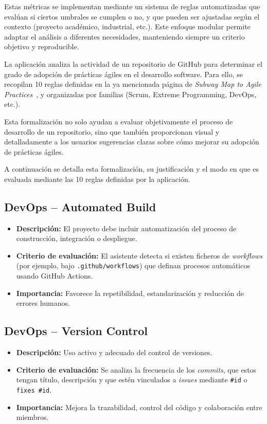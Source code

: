 Estas métricas se implementan mediante un sistema de reglas automatizadas que evalúan si ciertos umbrales se cumplen o no, y que pueden ser ajustadas según el contexto (proyecto académico, industrial, etc.). Este enfoque modular permite adaptar el análisis a diferentes necesidades, manteniendo siempre un criterio objetivo y reproducible.

La aplicación analiza la actividad de un repositorio de GitHub para determinar el grado de adopción de prácticas ágiles en el desarrollo software. Para ello, se recopilan 10 reglas definidas en la ya mencionada página de \textit{Subway Map to Agile Practices}~\cite{agileSubwayMap}, y organizadas por familias (Scrum, Extreme Programming, DevOps, etc.).

Esta formalización no solo ayudan a evaluar objetivamente el proceso de desarrollo de un repositorio, sino que también proporcionan visual y detalladamente a los usuarios sugerencias claras sobre cómo mejorar su adopción de prácticas ágiles.

A continuación se detalla esta formalización, su justificación y el modo en que es evaluada mediante las 10 reglas definidas por la aplicación.

\subsection{DevOps – Automated Build}

\begin{itemize}
  \item \textbf{Descripción:} El proyecto debe incluir automatización del proceso de construcción, integración o despliegue.
  \item \textbf{Criterio de evaluación:} El asistente detecta si existen ficheros de \textit{workflows} (por ejemplo, bajo \texttt{.github/workflows}) que definan procesos automáticos usando GitHub Actions.
  \item \textbf{Importancia:} Favorece la repetibilidad, estandarización y reducción de errores humanos.
\end{itemize}

\subsection{DevOps – Version Control}

\begin{itemize}
  \item \textbf{Descripción:} Uso activo y adecuado del control de versiones.
  \item \textbf{Criterio de evaluación:} Se analiza la frecuencia de los \textit{commits}, que estos tengan título, descripción y que estén vinculados a \textit{issues} mediante \texttt{\#id} o \texttt{fixes \#id}.
  \item \textbf{Importancia:} Mejora la trazabilidad, control del código y colaboración entre miembros.
\end{itemize}

